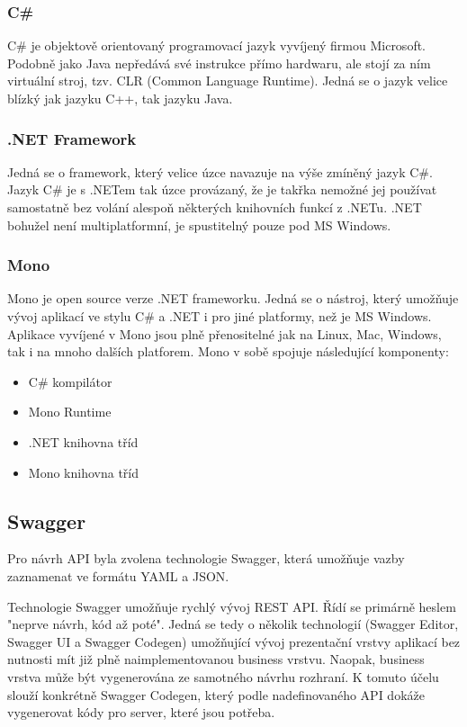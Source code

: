 \documentclass[thesis=B,czech]{FITthesis}[2012/06/26]
\begin{document}
	\subsubsection{C\#}
	C\# je objektově orientovaný programovací jazyk vyvíjený firmou Microsoft. Podobně jako Java nepředává své instrukce přímo hardwaru, ale stojí za ním virtuální stroj, tzv. CLR (Common Language Runtime). Jedná se o jazyk velice blízký jak jazyku C++, tak jazyku Java.
	
	
	\subsubsection{.NET Framework}
	Jedná se o framework, který velice úzce navazuje na výše zmíněný jazyk C\#. Jazyk C\# je s .NETem tak úzce provázaný, že je takřka nemožné jej používat samostatně bez volání alespoň některých knihovních funkcí z .NETu. .NET bohužel není multiplatformní, je spustitelný pouze pod MS Windows.
	
	\subsubsection{Mono}
Mono je open source verze .NET frameworku. Jedná se o nástroj, který umožňuje vývoj aplikací ve stylu C\# a .NET i pro jiné platformy, než je MS Windows. Aplikace vyvíjené v Mono jsou plně přenositelné jak na Linux, Mac, Windows, tak i na mnoho dalších platforem. Mono v sobě spojuje následující komponenty:
	
	\begin{itemize}
	\item C\# kompilátor
	\item Mono Runtime
	\item .NET knihovna tříd
	\item Mono knihovna tříd \cite{mono}
	\end{itemize}
	
	
    \subsection{Swagger}
    
    Pro návrh API byla zvolena technologie Swagger, která umožňuje vazby zaznamenat ve formátu YAML a JSON.
    
    Technologie Swagger umožňuje rychlý vývoj REST API. Řídí se primárně heslem "neprve návrh, kód až poté". Jedná se tedy o několik technologií (Swagger Editor, Swagger UI a Swagger Codegen) umožňující vývoj prezentační vrstvy aplikací bez nutnosti mít již plně naimplementovanou business vrstvu. Naopak, business vrstva může být vygenerována ze samotného návrhu rozhraní. K tomuto účelu slouží konkrétně Swagger Codegen, který podle nadefinovaného API dokáže vygenerovat kódy pro server, které jsou potřeba. \cite{swagger}
	
\end{document}
